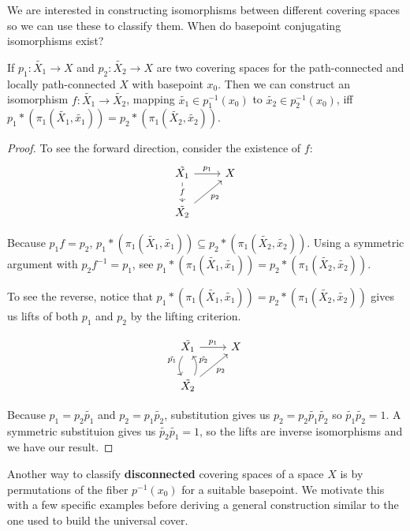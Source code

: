 \documentclass[10pt]{article}
\begin{document}
We are interested in constructing isomorphisms between different covering
spaces so we can use these to classify them. When do basepoint conjugating
isomorphisms exist?

\begin{exercise}
	If $p_1: \tilde{X_1} \to X$ and $p_2: \tilde{X_2} \to X$ are two covering
	spaces for the path-connected and locally path-connected $X$ with basepoint
	$x_0$. Then we can construct an isomorphism $f: \tilde{X_1} \to \tilde{X_2}$, mapping
	$\tilde{x_1} \in p_1^{-1}(x_0)$ to $\tilde{x_2} \in p_2^{-1}(x_0)$, iff
	$p_1*(\pi_1(\tilde{X_1}, \tilde{x_1})) = p_2*(\pi_1(\tilde{X_2}, \tilde{x_2}))$.
\end{exercise}

\begin{proof}
	To see the forward direction, consider the existence of $f$:
	\[
	\begin{tikzcd}
	\tilde{X_1} \arrow[r, "p_1"] \arrow[d, "f" description] & X \\
	\tilde{X_2} \arrow[ru, "p_2"']                          &  
	\end{tikzcd}
	\]

	Because $p_1f = p_2$, $p_1*(\pi_1(\tilde{X_1}, \tilde{x_1})) \subseteq
	p_2*(\pi_1(\tilde{X_2}, \tilde{x_2}))$. Using a symmetric argument with
	$p_2f^{-1} = p_1$, see $p_1*(\pi_1(\tilde{X_1}, \tilde{x_1})) = p_2*(\pi_1(\tilde{X_2},
	\tilde{x_2}))$.

	To see the reverse, notice that $p_1*(\pi_1(\tilde{X_1}, \tilde{x_1})) = p_2*(\pi_1(\tilde{X_2}, \tilde{x_2}))$ gives us lifts of both $p_1$ and $p_2$
	by the lifting criterion.

		\[
	\begin{tikzcd}
	\tilde{X_1} \arrow[r, "p_1"] \arrow[d, "\tilde{p_1}"', bend right]   & X \\
	\tilde{X_2} \arrow[ru, "p_2"'] \arrow[u, "\tilde{p_2}"', bend right] &  
	\end{tikzcd}
	\]

	Because $p_1 = p_2 \tilde{p_1}$ and $p_2 = p_1 \tilde{p_2}$, substitution gives
	us $p_2 = p_2 \tilde{p_1}\tilde{p_2}$ so $\tilde{p_1}\tilde{p_2} = 1$. A
	symmetric substituion gives us $\tilde{p_2}\tilde{p_1} = 1$, so the lifts are
	inverse isomorphisms and we have our result.

\end{proof}



Another way to classify \textbf{disconnected} covering spaces of a space $X$
is by permutations of the fiber $p^{-1}(x_0)$ for a suitable basepoint. We
motivate this with a few specific examples before deriving a general construction
similar to the one used to build the universal cover.
\end{document}
